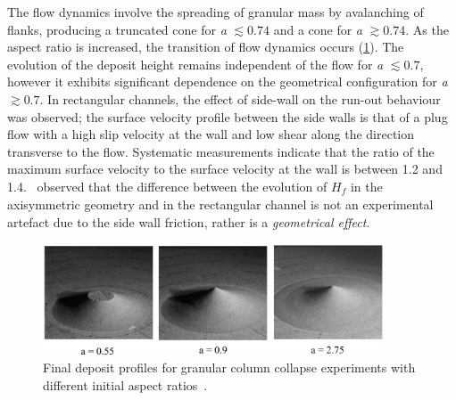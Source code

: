 The flow dynamics involve the spreading of granular mass 
by avalanching of flanks, producing a truncated cone for \textit{a} $\lesssim 
0.74$ and a cone for \textit{a} $\gtrsim 0.74$. As the aspect ratio is 
increased, the transition of flow dynamics occurs (\cref{fig:cone}). The 
evolution of the deposit height remains independent of the flow for \textit{a} 
$\lesssim 0.7$, however it exhibits significant dependence on the geometrical 
configuration for \textit{a} $\gtrsim 0.7$. In rectangular channels, the effect 
of side-wall on the run-out behaviour was observed; the surface velocity 
profile between the side walls is that of a plug flow with a high slip velocity 
at the wall and low shear along the direction transverse to the flow. 
Systematic measurements indicate that the ratio of the maximum surface velocity 
to the surface velocity at the wall is between 1.2 and 
1.4.~\citet{Lajeunesse2005} observed that the 
difference between the evolution of $\textit{H}_{\textit{f}}$ in the 
axisymmetric geometry and in the rectangular channel is not an experimental 
artefact due to the side wall friction, rather is a \textit{geometrical 
effect}. 

\begin{figure}
\centering
\includegraphics[width=0.9\textwidth]{cone}
\caption{Final deposit profiles for granular column collapse experiments with 
different initial aspect ratios~\citep{Lube2005}.}
\label{fig:cone}
\end{figure}


